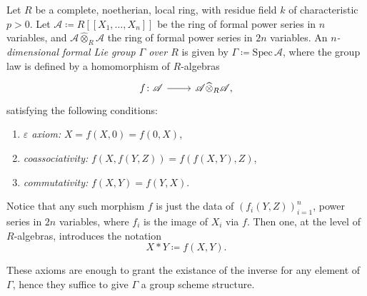 \documentclass[../Main]{subfiles}
\begin{document}
\begin{defn}
	Let $R$ be a complete, noetherian, local ring,
	with residue field $k$ of characteristic $p > 0$.
	Let $\mathscr{A} \coloneqq R [\![ X_1, \ldots, X_{ n } ]\!]$
	be the ring of formal power series in $n$ variables,
	and $\mathscr{A} \widehat{\otimes}_R \mathscr{A}$ the ring of formal power series 
	in $2n$ variables.
	An {\em $n$-dimensional formal Lie group $\Gamma$ over $R$} is 
	given by $\Gamma \coloneqq \mathrm{Spec}\, \mathscr{A}$,
	where the group law is defined by a homomorphism of $R$-algebras 
	\begin{equation*}
	\begin{tikzcd}[row sep = 0ex
		,/tikz/column 1/.append style={anchor=base east}
		,/tikz/column 2/.append style={anchor=base west}]
		f\colon \mathscr{A} \arrow[r, "", rightarrow] &
		\mathscr{A} \widehat{\otimes}_R \mathscr{A}
	,\end{tikzcd}
	\end{equation*} 
	satisfying the following conditions:
	\begin{enumerate}
		\item {\em $\varepsilon$ axiom:} $X = f(X,0) = f(0,X)$,
		\item {\em coassociativity:} $f(X, f(Y,Z)) = f(f(X,Y), Z)$,
		\item {\em commutativity:} $f(X,Y) = f(Y,X)$.
	\end{enumerate}
	Notice that any such morphism $f$ is just the data of 
	$\left( f_i(Y,Z) \right)_{i=1}^n$, power series in $2n$ variables, where
	$f_i$ is the image of $X_i$ via $f$.
	Then one, at the level of $R$-algebras, introduces the notation
	\begin{equation*}
		X \ast Y \coloneqq f(X,Y)
	.\end{equation*} 
\end{defn}

\begin{rem}[]
	These axioms are enough to grant the existance of the inverse for any element of $\Gamma$,
	hence they suffice to give $\Gamma$ a group scheme structure.
\end{rem}
\end{document}
